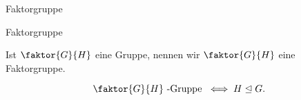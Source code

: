 \documentclass[class=article, crop=false]{standalone}
\begin{document}
\begin{zettel}{Faktorgruppe}
\begin{flashcard}[qq26a58i]{Faktorgruppe}
	\begin{definition}[Faktorgruppe]
		Ist $\faktor{G}{H}$ eine Gruppe, nennen wir $\faktor{G}{H}$ eine Faktorgruppe.
	\end{definition}
\end{flashcard}

\begin{theorem}
	\[
		\faktor{G}{H}\tx{-Gruppe} \iff H \trianglelefteq G
	.\]
\end{theorem}
\end{zettel}
\end{document}
